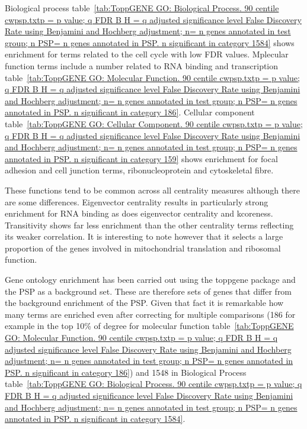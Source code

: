 Biological process table~\ref{tab:ToppGENE GO: Biological Process. 90 centile cwpsp.txtp = p value; q FDR B H = q adjusted significance level False Discovery Rate using Benjamini and Hochberg adjustment; n= n genes annotated in test group; n PSP= n genes annotated in PSP. n significant in category 1584} shows enrichment for terms related to the cell cycle with low FDR values. Mplecular function terms include a number related to RNA binding and transcription table~\ref{tab:ToppGENE GO: Molecular Function. 90 centile cwpsp.txtp = p value; q FDR B H = q adjusted significance level False Discovery Rate using Benjamini and Hochberg adjustment; n= n genes annotated in test group; n PSP= n genes annotated in PSP. n significant in category 186}. Cellular component table~\ref{tab:ToppGENE GO: Cellular Component. 90 centile cwpsp.txtp = p value; q FDR B H = q adjusted significance level False Discovery Rate using Benjamini and Hochberg adjustment; n= n genes annotated in test group; n PSP= n genes annotated in PSP. n significant in category 159} shows enrichment for focal adhesion and cell junction terms, ribonucleoprotein and cytoskeletal fibre. 

These functions tend to be common across all centrality measures although there are some differences. Eigenvector centrality results in particularly strong enrichment for RNA binding as does eigenvector centrality and kcoreness. Transitivity shows far less enrichment than the other centrality terms reflecting its weaker correlation. It is interesting to note however that it selects a large proportion of the genes involved in mitochondrial translation and ribosomal function. 


Gene ontology enrichment has been carried out using the toppgene package and the PSP as a background set. These are therefore sets of genes that differ from the background enrichment of the PSP. Given that fact it is remarkable how many terms are enriched even after correcting for multiple comparisons (186 for example in the top 10\% of degree for molecular function table~\ref{tab:ToppGENE GO: Molecular Function. 90 centile cwpsp.txtp = p value; q FDR B H = q adjusted significance level False Discovery Rate using Benjamini and Hochberg adjustment; n= n genes annotated in test group; n PSP= n genes annotated in PSP. n significant in category 186}) and 1548 in Biological Process table~\ref{tab:ToppGENE GO: Biological Process. 90 centile cwpsp.txtp = p value; q FDR B H = q adjusted significance level False Discovery Rate using Benjamini and Hochberg adjustment; n= n genes annotated in test group; n PSP= n genes annotated in PSP. n significant in category 1584}.

